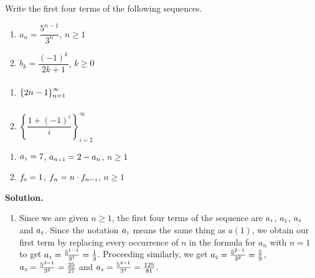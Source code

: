 \begin{ex} \label{seqex1}  Write the first four terms of the following sequences.

\begin{multicols}{2}
\begin{enumerate}


\item  $a_{n} = \dfrac{5^{n-1}}{3^{n}}$, $n \geq 1$

\item  $b_{k} = \dfrac{(-1)^{k}}{2k+1}$, $k \geq 0$

\setcounter{HW}{\value{enumi}}
\end{enumerate}
\end{multicols}

\begin{multicols}{2}
\begin{enumerate}
\setcounter{enumi}{\value{HW}}

\item  $\left\{ 2n - 1 \right\}_{n=1}^{\infty} \vphantom{\left\{\dfrac{1 + (-1)^{i}}{i} \right\}_{i=2}^{\infty}}$

\item  $\left\{\dfrac{1 + (-1)^{i}}{i} \right\}_{i=2}^{\infty}$

\setcounter{HW}{\value{enumi}}
\end{enumerate}
\end{multicols}

\begin{multicols}{2}
\begin{enumerate}
\setcounter{enumi}{\value{HW}}


\item  $a_{\mbox{\tiny$1$}} = 7$, $a_{n \mbox{\tiny$ + 1$}} = 2 - a_{n}$, $n \geq 1$

\item  \label{factorialintroex} $f_{\mbox{\tiny$0$}} = 1$, $f_{n} =n \cdot f_{n-\mbox{\tiny$1$}}$, $n \geq 1$

\setcounter{HW}{\value{enumi}}
\end{enumerate}
\end{multicols}



{\bf Solution.}

\begin{enumerate}

\item Since we are given $n \geq 1$, the first four terms of the sequence are  $a_{\mbox{\tiny$1$}}$, $a_{\mbox{\tiny$2$}}$, $a_{\mbox{\tiny$3$}}$ and $a_{\mbox{\tiny$4$}}$.  Since the notation $a_{\mbox{\tiny$1$}}$ means the same thing as $a(1)$, we obtain our first term by replacing every occurrence of $n$ in the formula for $a_{n}$ with $n=1$ to get  $a_{\mbox{\tiny$1$}} = \frac{5^{1-1}}{3^{1}} = \frac{1}{3}$.  Proceeding similarly, we get $a_{\mbox{\tiny$2$}} = \frac{5^{2-1}}{3^{2}} =\frac{5}{9}$, $a_{\mbox{\tiny$3$}} = \frac{5^{3-1}}{3^{3}} =\frac{25}{27}$ and $a_{\mbox{\tiny$4$}} = \frac{5^{4-1}}{3^{4}} =\frac{125}{81}$.  


\end{enumerate}
\end{ex}
